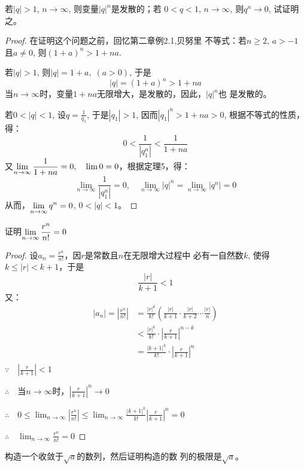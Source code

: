 \begin{example}
    若$|q|>1$, $n\to\infty$, 则变量$|q|^n$是发散的；若
$0<q<1$, $n\to\infty$, 则$q^n\to 0$, 试证明之。
\end{example}



\begin{proof}
在证明这个问题之前，回忆第二章例2.1,贝努里
不等式：若$n\ge 2$, $a>-1$且$a\ne 0$, 则$(1+a)^n>1+na$.

若$|q|>1$, 则$|q|=1+a,\; (a>0)$, 于是
\[|q|=(1+a)^n>1+na\]
当$n\to\infty$时，变量$1+na$无限增大，是发散的，因此，$|q|^n$也
是发散的。

若$0<|q|<1$, 设$q=\frac{1}{q_1}$,
于是$|q_1|>1$, 因而$|q_1|^n>1+na>0$, 根据不等式的性质，
得：
\[0<\frac{1}{|q^n_1|}<\frac{1}{1+na}\]
又$\displaystyle\lim_{n\to\infty}\dfrac{1}{1+na}=0,\quad \lim 0=0$，根据定理5，得：
\[\lim_{n\to\infty}\frac{1}{|q^n_1|}=0,\quad \lim_{n\to\infty}|q|^n=\lim_{n\to\infty}|q^n|=0\]
从而，$\displaystyle\lim_{n\to\infty}q^n=0$, $0<|q|<1$。
\end{proof}

\begin{example}
    证明$\displaystyle\lim_{n\to\infty}\dfrac{r^n}{n!}=0$
\end{example}

\begin{proof}
设$a_n=\frac{r^n}{n!}$，因$r$是常数且$n$在无限增大过程中
必有一自然数$k$, 使得$k\le |r|<k+1$，于是
\[\frac{|r|}{k+1}<1\]
又：
\[\begin{split}
|a_n|=\left|\frac{r^n}{n!}\right|&=\frac{|r|^k}{k!}\left(\frac{|r|}{k+1}\cdot \frac{|r|}{k+2}\cdots \frac{|r|}{n}\right)\\
&<\frac{|r|^k}{k!}\cdot \left|\frac{r}{k+1}\right|^{n-k}\\
&=\frac{|k+1|^k}{k!}\cdot \left|\frac{r}{k+1}\right|^{n}\\
\end{split}\]
$\because\quad  \left|\frac{r}{k+1}\right|<1$

$\therefore\quad $当$n\to\infty$时，$ \left|\frac{r}{k+1}\right|^n\to 0$
    
$\therefore\quad 0\le \lim_{n\to\infty}\left|\frac{r^n}{n!}\right|\le \lim_{n\to\infty}\frac{|k+1|^k}{k!} \left|\frac{r}{k+1}\right|^{n}=0$

$\therefore\quad \lim_{n\to\infty}\frac{r^n}{n!}=0$
\end{proof}

\begin{example}
    构造一个收敛于$\sqrt{a}$的数列，然后证明构造的数
列的极限是$\sqrt{a}$。
\end{example}

